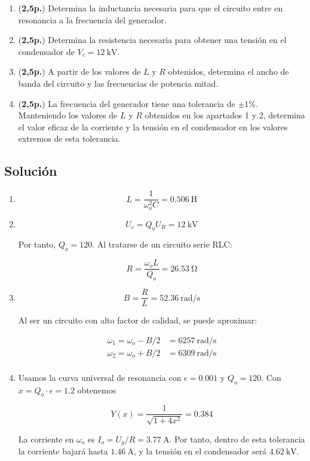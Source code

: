 \documentclass[12pt]{article}
\begin{document}
\begin{enumerate}

\item  (\textbf{2,5p.}) Determina la inductancia necesaria para que el circuito entre en resonancia a la frecuencia del generador.

\item  (\textbf{2,5p.}) Determina la resistencia necesaria para obtener una tensión en el condensador de $V_c = \SI{12}{\kilo\volt}$.
  
\item  (\textbf{2,5p.}) A partir de los valores de $L$ y $R$ obtenidos, determina el ancho de banda del circuito y las frecuencias de potencia mitad.

\item  (\textbf{2,5p.}) La frecuencia del generador tiene una tolerancia de $\pm1\%$. Manteniendo los valores de $L$ y $R$ obtenidos en los apartados 1 y 2, determina el valor eficaz de la corriente y la tensión en el condensador en los valores extremos de esta tolerancia.
  
\end{enumerate}

\subsection*{Solución}

\begin{enumerate}
\item 

  \[
    L = \frac{1}{\omega_o^2 C} = \SI{0.506}{\henry}
  \]
  
\item

  \[
    U_c = Q_o U_R = \SI{12}{\kilo\volt}
  \]

  Por tanto, $Q_o = 120$. Al tratarse de un circuito serie RLC:

  \[
    R = \frac{\omega_o L}{Q_o} = \SI{26.53}{\ohm}
  \]
    
\item

  \[
    B = \frac{R}{L} = \SI{52.36}{\radian\per\second}
  \]

  Al ser un circuito con alto factor de calidad, se puede aproximar:

  \begin{align*}
    \omega_1 = \omega_o - B/2 &= \SI{6257}{\radian\per\second}\\
    \omega_2 = \omega_o + B/2 &= \SI{6309}{\radian\per\second}\\
  \end{align*}
\item

  Usamos la curva universal de resonancia con $\epsilon = 0.001$ y $Q_o = 120$. Con $x = Q_o \cdot \epsilon = 1.2$ obtenemos

  \[
    Y(x) = \frac{1}{\sqrt{1 + 4 x^2}} = 0.384
  \]

  La corriente en $\omega_o$ es $I_o = U_g/R = \SI{3.77}{\ampere}$. Por tanto, dentro de esta tolerancia la corriente bajará hasta $\SI{1.46}{\ampere}$, y la tensión en el condensador será $\SI{4.62}{\kilo\volt}$.
\end{enumerate}
\end{document}
